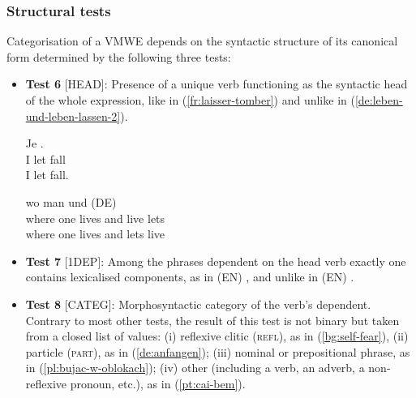 \documentclass[output=paper,
modfonts,
]{langscibook}
\begin{document}
\subsubsection{Structural tests}
\label{sec:structure}
%
Categorisation of a VMWE %
depends on the syntactic structure of its canonical form determined by the following three tests:
\begin{itemize}
\item[]\textbf{Test 6} [HEAD]: Presence of a unique verb functioning as the syntactic head of the whole expression, like in (\ref{fr:laisser-tomber}) 
and unlike in (\ref{de:leben-und-leben-lassen-2}).

\ea \label{fr:laisser-tomber}
\settowidth {} 
\gll Je  .\\
I let fall \\ 
\glt I let fall. 
\z

\ea \label{de:leben-und-leben-lassen-2}
\settowidth {} 
\gll wo man  und   (DE)\\
where one lives and live lets \\
\glt where one lives and lets live 
\z

\item[]\textbf{Test 7} [1DEP]: 
Among the phrases dependent on the head verb exactly one contains lexicalised components, 
as in (EN) , and unlike in (EN) . 

\item[]\textbf{Test 8} [CATEG]: Morphosyntactic category of the verb's dependent. 
Contrary to most other tests, the result of this test is not binary but taken from a closed list of values: (i) reflexive clitic (\textsc{refl}), as in (\ref{bg:self-fear}), 
(ii) particle (\textsc{part}), as in (\ref{de:anfangen});
(iii) nominal or prepositional phrase, as in (\ref{pl:bujac-w-oblokach}); 
(iv) other (including a verb, an adverb, a non-reflexive pronoun, etc.), as in (\ref{pt:cai-bem}).


\end{itemize}
\end{document}
